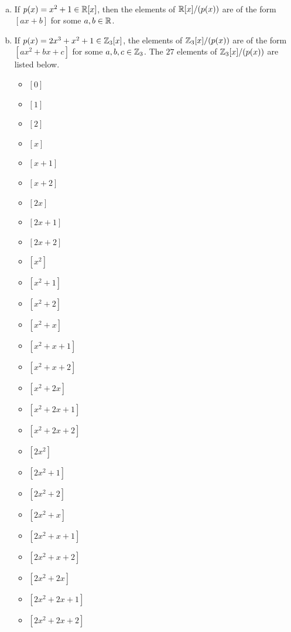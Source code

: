 \documentclass[11pt,fleqn,dvipsnames,usenames]{article}
\begin{document}
\begin{examples}~
\begin{enumerate}[(a)]
\item If $p(x) = x^2 + 1\in \mathbb{R}[x]$, then the elements of $\mathbb{R}[x]/(p(x))$ are of the form $[ax+b]$ for some $a,b\in \mathbb{R}$.
\item If $p(x) = 2x^3 + x^2 + 1\in \mathbb{Z}_3[x]$, the elements of $\mathbb{Z}_3[x]/(p(x))$ are of the form $[ax^2 + bx + c]$ for some $a,b,c\in\mathbb{Z}_3$.  The $27$ elements of $\mathbb{Z}_3[x]/(p(x))$ are listed below.
\begin{multicols}{4}
\begin{itemize}[\ ]
\item $[0]$ 
\item $[1]$
\item $[2]$
\item $[x]$ 
\item $[x + 1]$
\item $[x+2]$
\item $[2x]$
\item $[2x + 1]$
\item $[2x+2]$
\item $[x^2]$
\item $[x^2 + 1]$
\item $[x^2 + 2]$
\item $[x^2 + x]$
\item $[x^2 + x + 1]$
\item $[x^2 + x + 2]$
\item $[x^2 + 2x]$
\item $[x^2 + 2x + 1]$
\item $[x^2 + 2x + 2]$
\item $[2x^2]$
\item $[2x^2 + 1]$
\item $[2x^2 + 2]$
\item $[2x^2 + x]$
\item $[2x^2 + x + 1]$
\item $[2x^2 + x + 2]$
\item $[2x^2 + 2x]$
\item $[2x^2 + 2x + 1]$
\item $[2x^2 + 2x + 2]$
\end{itemize}
\end{multicols}
\end{enumerate}
\end{examples}
\vsmsp

%
%
%
%
\end{document}
